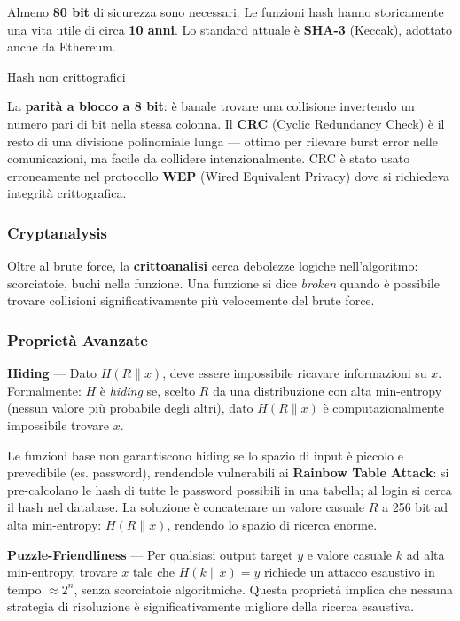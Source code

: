 \documentclass[
  italian,
  openany]{book}
\begin{document}
Almeno \textbf{80 bit} di sicurezza sono necessari. Le funzioni hash
hanno storicamente una vita utile di circa \textbf{10 anni}. Lo standard
attuale è \textbf{SHA-3} (Keccak), adottato anche da Ethereum.

\begin{calloutwarning}{Hash non crittografici}

La \textbf{parità a blocco a 8 bit}: è banale trovare una collisione
invertendo un numero pari di bit nella stessa colonna. Il \textbf{CRC}
(Cyclic Redundancy Check) è il resto di una divisione polinomiale lunga
--- ottimo per rilevare burst error nelle comunicazioni, ma facile da
collidere intenzionalmente. CRC è stato usato erroneamente nel
protocollo \textbf{WEP} (Wired Equivalent Privacy) dove si richiedeva
integrità crittografica.

\end{calloutwarning}

\subsubsection{Cryptanalysis}\label{cryptanalysis}

Oltre al brute force, la \textbf{crittoanalisi} cerca debolezze logiche
nell'algoritmo: scorciatoie, buchi nella funzione. Una funzione si dice
\emph{broken} quando è possibile trovare collisioni significativamente
più velocemente del brute force.

\subsubsection{Proprietà Avanzate}\label{proprietuxe0-avanzate}

\textbf{Hiding} --- Dato \(H(R \| x)\), deve essere impossibile ricavare
informazioni su \(x\). Formalmente: \(H\) è \emph{hiding} se, scelto
\(R\) da una distribuzione con alta min-entropy (nessun valore più
probabile degli altri), dato \(H(R \| x)\) è computazionalmente
impossibile trovare \(x\).

Le funzioni base non garantiscono hiding se lo spazio di input è piccolo
e prevedibile (es. password), rendendole vulnerabili ai \textbf{Rainbow
Table Attack}: si pre-calcolano le hash di tutte le password possibili
in una tabella; al login si cerca il hash nel database. La soluzione è
concatenare un valore casuale \(R\) a 256 bit ad alta min-entropy:
\(H(R \| x)\), rendendo lo spazio di ricerca enorme.

\textbf{Puzzle-Friendliness} --- Per qualsiasi output target \(y\) e
valore casuale \(k\) ad alta min-entropy, trovare \(x\) tale che
\(H(k \| x) = y\) richiede un attacco esaustivo in tempo
\(\approx 2^n\), senza scorciatoie algoritmiche. Questa proprietà
implica che nessuna strategia di risoluzione è significativamente
migliore della ricerca esaustiva.
\end{document}

